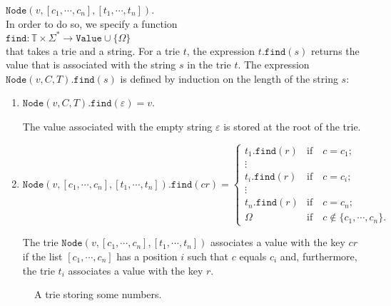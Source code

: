 \hspace*{1.3cm} 
$\mathtt{Node}(v, [c_1, \cdots, c_n], [t_1, \cdots, t_n])$.
\\[0.2cm]
In order to do so, we specify a function
\\[0.2cm]
\hspace*{1.3cm} 
$\mathtt{find}: \mathbb{T} \times \Sigma^* \rightarrow \mathtt{Value} \cup \{ \Omega\}$
\\[0.2cm]
that takes a trie and a string.  For a trie $t$, the expression $t.\mathtt{find}(s)$ returns the
value that is associated with the string $s$ in the trie $t$.  The expression
$\mathtt{Node}(v,C,T).\mathtt{find}(s)$ is defined by induction on the length of the  string $s$:
\begin{enumerate}
\item $\mathtt{Node}(v, C, T).\mathtt{find}(\varepsilon) = v$.

      The value associated with the empty string $\varepsilon$ is stored at the root of the trie.
\item $\mathtt{Node}(v, [c_1, \cdots, c_n], [t_1, \cdots, t_n]).\mathtt{find}(cr) = 
        \left\{
        \begin{array}{ll}
        t_1.\mathtt{find}(r) & \mbox{if} \quad c = c_1 \mbox{;} \\
        \vdots &                                     \\
        t_i.\mathtt{find}(r) & \mbox{if} \quad c = c_i \mbox{;} \\
        \vdots &                                     \\
        t_n.\mathtt{find}(r) & \mbox{if} \quad c = c_n \mbox{;} \\[0.2cm]
        \Omega               & \mbox{if} \quad c \notin \{c_1,\cdots,c_n\} \mbox{.}         
        \end{array}
       \right.$

      The trie $\mathtt{Node}(v, [c_1, \cdots, c_n], [t_1, \cdots, t_n])$ associates a value with
      the key $cr$ if the list $[c_1, \cdots, c_n]$ has a position $i$ such that $c$ equals $c_i$
      and, furthermore, the trie  $t_i$ associates a value with the key  $r$.
\end{enumerate}

\begin{figure}[!ht]
  \centering
  \caption{A trie storing some numbers.}
  \label{fig:trie}
\end{figure}

